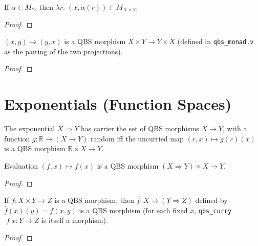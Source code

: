 \begin{lemma}\label{lem:qbs_Mx_pair_cstl}
  \rocqok
  If $\alpha \in M_Y$, then $\lambda r.\; (x, \alpha(r)) \in M_{X \times Y}$.
\end{lemma}
\begin{proof}\rocqok\end{proof}

\begin{lemma}\label{lem:qbs_morphism_swap}
  \rocqok
  $(x, y) \mapsto (y, x)$ is a QBS morphism $X \times Y \to Y \times X$
  (defined in \texttt{qbs\_monad.v} as the pairing of the two projections).
\end{lemma}
\begin{proof}\rocqok\end{proof}

\section{Exponentials (Function Spaces)}\label{sec:exponentials}

\begin{definition}\label{def:expQ}
  \rocqok
  The exponential $X \Rightarrow Y$ has carrier the set of QBS morphisms
  $X \to Y$, with a function $g : \mathbb{R} \to (X \to Y)$ random iff the
  uncurried map $(r, x) \mapsto g(r)(x)$ is a QBS morphism
  $\mathbb{R} \times X \to Y$.
\end{definition}

\begin{theorem}\label{thm:qbs_morphism_eval}
  \rocqok
  Evaluation $(f, x) \mapsto f(x)$ is a QBS morphism
  $(X \Rightarrow Y) \times X \to Y$.
\end{theorem}
\begin{proof}\rocqok\end{proof}

\begin{theorem}\label{thm:qbs_morphism_curry}
  \rocqok
  If $f : X \times Y \to Z$ is a QBS morphism, then
  $\hat{f} : X \to (Y \Rightarrow Z)$ defined by
  $\hat{f}(x)(y) = f(x,y)$ is a QBS morphism
  (for each fixed $x$, \texttt{qbs\_curry}$\;f\;x : Y \to Z$ is itself a
  morphism).
\end{theorem}
\begin{proof}\rocqok\end{proof}

